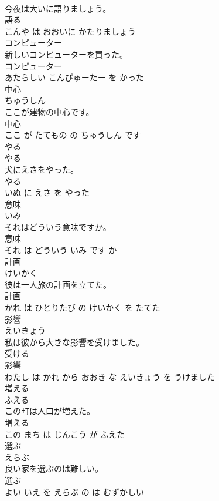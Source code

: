 \documentclass[8pt]{extreport}
\begin{document}
\begin{CJK}{UTF8}{min}
\\	今夜は大いに語りましょう。	
\\	語る 
\\	こんや は おおいに かたりましょう			
\\	コンピューター	
\\	新しいコンピューターを買った。	
\\	コンピューター 
\\	あたらしい こんぴゅーたー を かった			
\\	中心	
\\	ちゅうしん			
\\	ここが建物の中心です。	
\\	中心 
\\	ここ が たてもの の ちゅうしん です			
\\	やる	
\\	やる			
\\	犬にえさをやった。	
\\	やる 
\\	いぬ に えさ を やった			
\\	意味	
\\	いみ			
\\	それはどういう意味ですか。	
\\	意味 
\\	それ は どういう いみ です か			
\\	計画	
\\	けいかく			
\\	彼は一人旅の計画を立てた。	
\\	計画 
\\	かれ は ひとりたび の けいかく を たてた			
\\	影響	
\\	えいきょう			
\\	私は彼から大きな影響を受けました。	
\\	受ける 
\\	影響 
\\	わたし は かれ から おおき な えいきょう を うけました			
\\	増える	
\\	ふえる			
\\	この町は人口が増えた。	
\\	増える 
\\	この まち は じんこう が ふえた			
\\	選ぶ	
\\	えらぶ			
\\	良い家を選ぶのは難しい。	
\\	選ぶ 
\\	よい いえ を えらぶ の は むずかしい			

\end{CJK}
\end{document}
